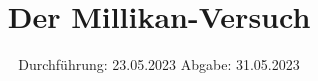 

\subject{VERSUCH NUMMER 401}
\title{Der Millikan-Versuch}
\date{
  Durchführung: 23.05.2023
  \hspace{3em}
  Abgabe: 31.05.2023
}



\maketitle
\thispagestyle{empty}
\tableofcontents
\newpage
\setcounter{page}{1}







\newpage
\printbibliography
\nocite{ap401}
\nocite{matplotlib}
\nocite{numpy}
\nocite{scipy}
\nocite{uncertainties}
\nocite{reback2020pandas}

\newpage

%
%


